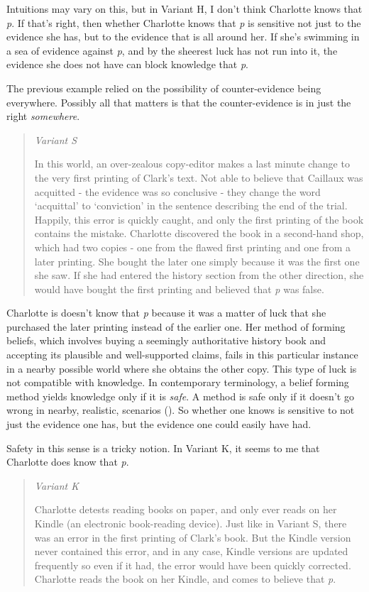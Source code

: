 \documentclass[
  12pt,
  letterpaper,
]{scrbook}
\begin{document}
Intuitions may vary on this, but in Variant H, I don't think Charlotte
knows that \emph{p}. If that's right, then whether Charlotte knows that
\emph{p} is sensitive not just to the evidence she has, but to the
evidence that is all around her. If she's swimming in a sea of evidence
against \emph{p}, and by the sheerest luck has not run into it, the
evidence she does not have can block knowledge that \emph{p}.

The previous example relied on the possibility of counter-evidence being
everywhere. Possibly all that matters is that the counter-evidence is in
just the right \emph{somewhere}.

\begin{quote}
\emph{Variant S}

In this world, an over-zealous copy-editor makes a last minute change to
the very first printing of Clark's text. Not able to believe that
Caillaux was acquitted - the evidence was so conclusive - they change
the word `acquittal' to `conviction' in the sentence describing the end
of the trial. Happily, this error is quickly caught, and only the first
printing of the book contains the mistake. Charlotte discovered the book
in a second-hand shop, which had two copies - one from the flawed first
printing and one from a later printing. She bought the later one simply
because it was the first one she saw. If she had entered the history
section from the other direction, she would have bought the first
printing and believed that \emph{p} was false.
\end{quote}

Charlotte is doesn't know that \emph{p} because it was a matter of luck
that she purchased the later printing instead of the earlier one. Her
method of forming beliefs, which involves buying a seemingly
authoritative history book and accepting its plausible and
well-supported claims, fails in this particular instance in a nearby
possible world where she obtains the other copy. This type of luck is
not compatible with knowledge. In contemporary terminology, a belief
forming method yields knowledge only if it is \emph{safe}. A method is
safe only if it doesn't go wrong in nearby, realistic, scenarios
(). So whether one knows
is sensitive to not just the evidence one has, but the evidence one
could easily have had.

Safety in this sense is a tricky notion. In Variant K, it seems to me
that Charlotte does know that \emph{p}.

\begin{quote}
\emph{Variant K}

Charlotte detests reading books on paper, and only ever reads on her
Kindle (an electronic book-reading device). Just like in Variant S,
there was an error in the first printing of Clark's book. But the Kindle
version never contained this error, and in any case, Kindle versions are
updated frequently so even if it had, the error would have been quickly
corrected. Charlotte reads the book on her Kindle, and comes to believe
that \emph{p}.
\end{quote}
\end{document}
